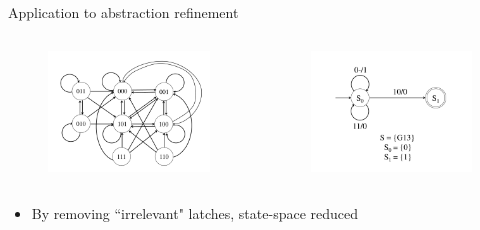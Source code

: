 \documentclass[xcolor=dvipsnames]{beamer}
\newcommand{\bi}{\begin{itemize}}
\newcommand{\ei}{\end{itemize}}
\begin{document}
\begin{frame}{\large{Application to abstraction refinement}}
\vspace{-0.1in}
\begin{columns}[onlytextwidth]
\begin{column}{0.5\textwidth}
\begin{figure}
\centering
\includegraphics[scale=0.25]{../newfig/s27_stg.pdf}
\end{figure}
\end{column}
\begin{column}{0.5\textwidth}
\begin{figure}
\centering
\includegraphics[scale=0.25]{../newfig/s27_stg_refined.pdf}
\end{figure}
\end{column}
\end{columns}
\bi
\item By removing ``irrelevant" latches, state-space reduced
\ei
\end{frame}
\end{document}
